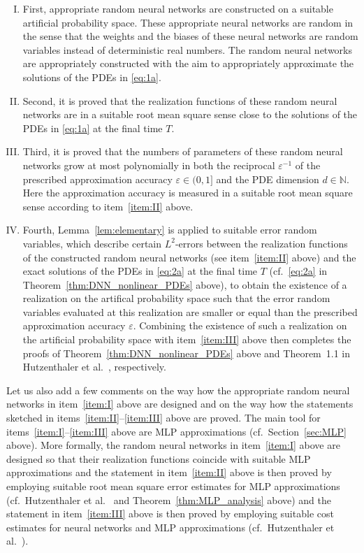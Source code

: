 \documentclass[12pt]{article}
\theoremstyle{definition}
\newcommand{\N}{\mathbb{N}}
\begin{document}
\begin{enumerate}[(I)]
\item 
\label{item:I}
First, appropriate random neural networks are constructed 
on a suitable artificial probability space. 
These appropriate neural networks 
are random in the sense that the weights and the biases of these 
neural networks are random variables instead of deterministic real numbers. 
The random neural networks are appropriately constructed with the aim 
to appropriately approximate the solutions of the PDEs in \eqref{eq:1a}.
%
%
\item 
\label{item:II}
Second, it is proved that the realization functions of 
these random neural networks are in a suitable root mean square sense 
close to the solutions of the PDEs in \eqref{eq:1a} at the final time $ T $. 
%
%
\item 
\label{item:III}
Third, it is proved that the numbers of parameters 
of these random neural networks 
grow at most polynomially in both 
the reciprocal $ \varepsilon^{ - 1 } $ of the 
prescribed approximation accuracy $ \varepsilon \in (0,1] $ 
and the PDE dimension $ d \in \N $. 
Here the approximation accuracy is measured in a suitable root mean square sense 
according to item~\eqref{item:II} above.
%
%
\item 
Fourth, Lemma~\ref{lem:elementary} is applied 
to suitable error random variables, which describe 
certain $ L^2 $-errors between the realization functions 
of the constructed random neural networks 
(see item~\eqref{item:II} above)
and the exact solutions of the PDEs in \eqref{eq:2a} at the final time $ T $
(cf.\ \eqref{eq:2a} in Theorem~\ref{thm:DNN_nonlinear_PDEs} above), 
to obtain the existence of a realization on 
the artifical probability space such that 
the error random variables evaluated 
at this realization are smaller or equal than 
the prescribed approximation accuracy $ \varepsilon $. 
Combining the existence of such a realization 
on the artificial probability space 
with item~\eqref{item:III} above 
then completes 
the proofs of 
Theorem~\ref{thm:DNN_nonlinear_PDEs} above 
and 
Theorem~1.1 in 
Hutzenthaler et al.~\cite{hutzenthaler2020proof}, 
respectively. 
\end{enumerate}
%
%
Let us also add a few comments 
on the way how the appropriate random neural networks 
in item~\eqref{item:I} above are designed 
and on the way how the statements sketched in 
items~\eqref{item:II}--\eqref{item:III} above are proved. 
The main tool for items~\eqref{item:I}--\eqref{item:III} above 
are MLP approximations 
(cf.\ Section~\ref{sec:MLP} above). 
More formally, 
the random neural networks in item~\eqref{item:I} above 
are designed so that their realization functions 
coincide with suitable MLP approximations 
and the statement in item~\eqref{item:II} above 
is then proved by employing suitable root mean square error 
estimates for MLP approximations 
(cf.\ Hutzenthaler et al.~\cite[Theorem~3.5]{Hutzenthaleretal2018arXiv} and Theorem~\ref{thm:MLP_analysis} above)
and the statement in item~\eqref{item:III} above 
is then proved by employing suitable cost estimates 
for neural networks and MLP approximations 
(cf.\ Hutzenthaler et al.~\cite[Sections~3.2--3.3]{hutzenthaler2020proof}). 
\end{document}
